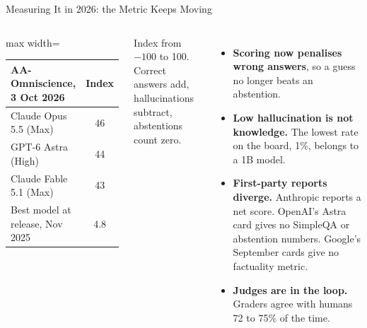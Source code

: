 \begin{frame}{Measuring It in 2026: the Metric Keeps Moving}
    \begin{columns}[T,onlytextwidth]
        \centering
        \small
        \renewcommand{\arraystretch}{1.15}
        \begin{adjustbox}{max width=\linewidth}\begin{tabular}{lc}
            \toprule
            \textbf{AA-Omniscience, 3 Oct 2026} & \textbf{Index} \\
            \midrule
            Claude Opus 5.5 (Max) & 46 \\
            GPT-6 Astra (High) & 44 \\
            Claude Fable 5.1 (Max) & 43 \\
            Best model at release, Nov 2025 & 4.8 \\
            \bottomrule
        \end{tabular}\end{adjustbox}

        \vspace{0.4em}
        {\scriptsize Index from $-100$ to 100. Correct answers add, hallucinations subtract, abstentions count zero.}
        \begin{itemize}\itemsep0.4em
            \item \textbf{Scoring now penalises wrong answers}, so a guess no longer beats an abstention.
            \item \textbf{Low hallucination is not knowledge.} The lowest rate on the board, 1\%, belongs to a 1B model.
            \item \textbf{First-party reports diverge.} Anthropic reports a net score. OpenAI's Astra card gives no SimpleQA or abstention numbers. Google's September cards give no factuality metric.
            \item \textbf{Judges are in the loop.} Graders agree with humans 72 to 75\% of the time.
        \end{itemize}
    \end{columns}
    \vspace{0.2em}
\end{frame}

